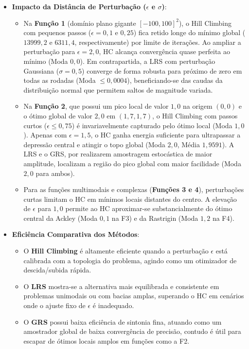 \documentclass[journal,onecolumn]{IEEEtran}
\begin{document}
\begin{itemize}
    \item \textbf{Impacto da Distância de Perturbação ($\epsilon$ e $\sigma$)}:
    \begin{itemize}
        \item Na \textbf{Função 1} (domínio plano gigante $[-100, 100]^2$), o Hill Climbing com pequenos passos ($\epsilon=0{,}1$ e $0{,}25$) fica retido longe do mínimo global ($13999{,}2$ e $6311{,}4$, respectivamente) por limite de iterações. Ao ampliar a perturbação para $\epsilon=2{,}0$, HC alcança convergência quase perfeita ao mínimo (Moda $0{,}0$). Em contrapartida, a LRS com perturbação Gaussiana ($\sigma=0{,}5$) converge de forma robusta para próximo de zero em todas as rodadas (Moda $\le 0{,}0004$), beneficiando-se das caudas da distribuição normal que permitem saltos de magnitude variada.
        \item Na \textbf{Função 2}, que possui um pico local de valor $1{,}0$ na origem $(0,0)$ e o ótimo global de valor $2{,}0$ em $(1{,}7, 1{,}7)$, o Hill Climbing com passos curtos ($\epsilon \le 0{,}75$) é invariavelmente capturado pelo ótimo local (Moda $1{,}0$). Apenas com $\epsilon=1{,}5$, o HC ganha energia suficiente para ultrapassar a depressão central e atingir o topo global (Moda $2{,}0$, Média $1{,}9591$). A LRS e o GRS, por realizarem amostragem estocástica de maior amplitude, localizam a região do pico global com maior facilidade (Moda $2{,}0$ para ambos).
        \item Para as funções multimodais e complexas (\textbf{Funções 3 e 4}), perturbações curtas limitam o HC em mínimos locais distantes do centro. A elevação de $\epsilon$ para $1{,}0$ permite ao HC aproximar-se substancialmente do ótimo central da Ackley (Moda $0{,}1$ na F3) e da Rastrigin (Moda $1{,}2$ na F4).
    \end{itemize}
    \item \textbf{Eficiência Comparativa dos Métodos}:
    \begin{itemize}
        \item O \textbf{Hill Climbing} é altamente eficiente quando a perturbação $\epsilon$ está calibrada com a topologia do problema, agindo como um otimizador de descida/subida rápida.
        \item O \textbf{LRS} mostra-se a alternativa mais equilibrada e consistente em problemas unimodais ou com bacias amplas, superando o HC em cenários onde o ajuste fixo de $\epsilon$ é inadequado.
        \item O \textbf{GRS} possui baixa eficiência de sintonia fina, atuando como um amostrador global de baixa convergência de precisão, contudo é útil para escapar de ótimos locais amplos em funções como a F2.

\end{itemize}
\end{itemize}
\end{document}
